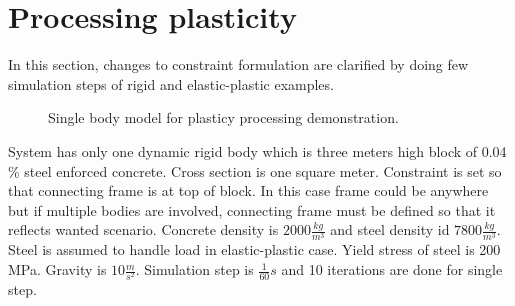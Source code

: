\section{Processing plasticity}

In this section, changes to constraint formulation are clarified by doing few simulation steps of rigid and
elastic-plastic examples.

\begin{figure}[htb!]
\centering
{}
\caption{Single body model for plasticy processing demonstration.}
\label{fig:tensionModel}
\end{figure}

System has only one dynamic rigid body which is three meters high block of 0.04 \% steel enforced concrete. 
Cross section is one square meter.
Constraint is set so that connecting frame is at top of block. 
In this case frame could be anywhere but if multiple bodies are involved, connecting frame must be defined
so that it reflects wanted scenario.
Concrete density is $2000 \frac{kg}{m^3}$ and steel density id $7800 \frac{kg}{m^3}$. 
Steel is assumed to handle load in elastic-plastic case. Yield stress of steel is 200 MPa.
Gravity is $10 \frac{m}{s^2}$. Simulation step is $\frac{1}{60} s$ and 10 
iterations are done for single step.

